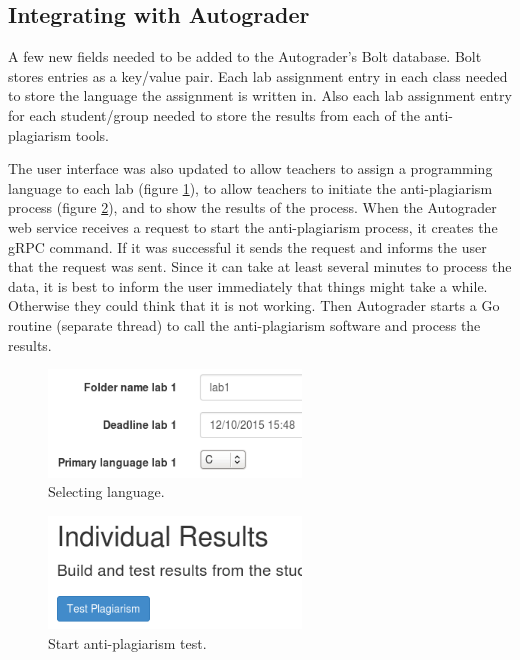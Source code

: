 \documentclass[10pt,journal,compsoc]{IEEEtran}
\begin{document}
		\subsection{Integrating with Autograder}
		A few new fields needed to be added to the Autograder's Bolt database. Bolt stores entries as a key/value pair. Each lab assignment entry in each class needed to store the language the assignment is written in. Also each lab assignment entry for each student/group needed to store the results from each of the anti-plagiarism tools.
		
		The user interface was also updated to allow teachers to assign a programming language to each lab (figure \ref{fig:selectLang}), to allow teachers to initiate the anti-plagiarism process (figure \ref{fig:startTest}), and to show the results of the process. When the Autograder web service receives a request to start the anti-plagiarism process, it creates the gRPC command. If it was successful it sends the request and informs the user that the request was sent. Since it can take at least several minutes to process the data, it is best to inform the user immediately that things might take a while. Otherwise they could think that it is not working. Then Autograder starts a Go routine (separate thread) to call the anti-plagiarism software and process the results.
		
		\begin{figure}[h!]
			\includegraphics[width=0.6\textwidth]{SelectingLanguage.png}
			\caption{Selecting language.}
			\label{fig:selectLang}
		\end{figure}
				
		\begin{figure}[h!]
			\includegraphics[width=0.6\textwidth]{StartTest.png}
			\caption{Start anti-plagiarism test.}
			\label{fig:startTest}
		\end{figure}
		
\end{document}
